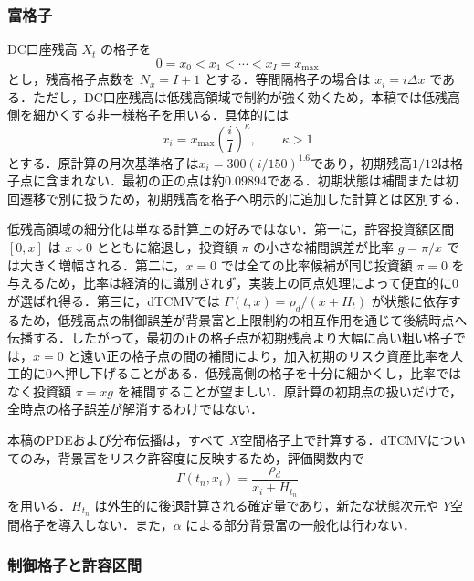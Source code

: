 \documentclass[10pt,a4paper]{article}
\theoremstyle{plain}
\theoremstyle{definition}
\begin{document}
\subsubsection{富格子}

DC口座残高 $X_t$ の格子を
\begin{equation}
  0=x_0<x_1<\cdots<x_I=x_{\max}
  \label{eq:wealth-grid}
\end{equation}
とし，残高格子点数を $N_x=I+1$ とする．等間隔格子の場合は $x_i=i\Delta x$ である．ただし，DC口座残高は低残高領域で制約が強く効くため，本稿では低残高側を細かくする非一様格子を用いる．具体的には
\begin{equation}
  x_i=x_{\max}\left(\frac{i}{I}\right)^\kappa,
  \qquad \kappa>1
  \label{eq:nonuniform-grid}
\end{equation}
とする．原計算の月次基準格子は$x_i=300(i/150)^{1.6}$であり，初期残高$1/12$は格子点に含まれない．最初の正の点は約0.09894である．初期状態は補間または初回遷移で別に扱うため，初期残高を格子へ明示的に追加した計算とは区別する．

低残高領域の細分化は単なる計算上の好みではない．第一に，許容投資額区間 $[0,x]$ は $x\downarrow0$ とともに縮退し，投資額 $\pi$ の小さな補間誤差が比率 $g=\pi/x$ では大きく増幅される．第二に，$x=0$ では全ての比率候補が同じ投資額 $\pi=0$ を与えるため，比率は経済的に識別されず，実装上の同点処理によって便宜的に0が選ばれ得る．第三に，dTCMVでは $\Gamma(t,x)=\rho_d/(x+H_t)$ が状態に依存するため，低残高点の制御誤差が背景富と上限制約の相互作用を通じて後続時点へ伝播する．したがって，最初の正の格子点が初期残高より大幅に高い粗い格子では，$x=0$ と遠い正の格子点の間の補間により，加入初期のリスク資産比率を人工的に0へ押し下げることがある．低残高側の格子を十分に細かくし，比率ではなく投資額 $\pi=xg$ を補間することが望ましい．原計算の初期点の扱いだけで，全時点の格子誤差が解消するわけではない．

本稿のPDEおよび分布伝播は，すべて $X$空間格子上で計算する．dTCMVについてのみ，背景富をリスク許容度に反映するため，評価関数内で
\begin{equation}
  \Gamma(t_n,x_i)=\frac{\rho_d}{x_i+H_{t_n}}
  \label{eq:gamma-grid}
\end{equation}
を用いる．$H_{t_n}$ は外生的に後退計算される確定量であり，新たな状態次元や $Y$空間格子を導入しない．また，$\alpha$ による部分背景富の一般化は行わない．

\subsubsection{制御格子と許容区間}
\end{document}
